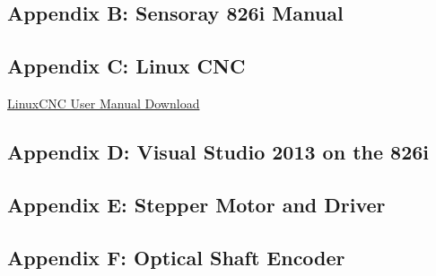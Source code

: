 \documentclass[12pt]{article}
\begin{document}
\clearpage

\subsection*{Appendix B: Sensoray 826i Manual}

\clearpage



\subsection*{Appendix C: Linux CNC}


\href{http://www.linuxcnc.org/docs/2.6/pdf/LinuxCNC_User_Manual.pdf}{LinuxCNC User Manual Download}
%

%

%


\subsection*{Appendix D: Visual Studio 2013 on the 826i}






\subsection*{Appendix E: Stepper Motor and Driver}








\subsection*{Appendix F: Optical Shaft Encoder}


\end{document}
